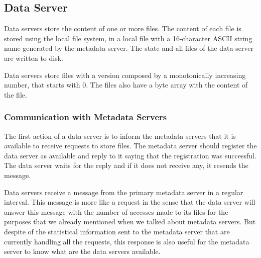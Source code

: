 \subsection{Data Server}

Data servers store the content of one or more files. The content of each
file is stored using the local file system, in a local file with a
16-character ASCII string name generated by the metadata server. The
state and all files of the data server are written to disk.

Data servers store files with a version composed by a
monotonically increasing number, that starts with 0.
The files also have a byte array with the content of the file.

\subsubsection{Communication with Metadata Servers}

The first action of a data server is to inform the metadata servers that
it is available to receive requests to store files. The metadata
server should register the data server as available and reply to it saying 
that the registration was successful. The data server waits for the
reply and if it does not receive any, it resends the message.

Data servers receive a message from the primary metadata server in a regular
interval. This message is more like a request in the sense that the data server
will answer this message with the number of accesses made to its files
for the purposes that we already mentioned when we talked about metadata
servers. But despite of the statistical information sent to the metadata server that are
currently handling all the requests, this response is also useful for the metadata
server to know what are the data servers available.


